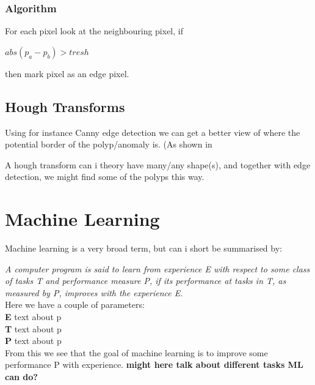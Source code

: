 \documentclass[a4paper,english]{ifimaster}
\begin{document}
	    \subsubsection{Algorithm}
	      For each pixel look at the neighbouring pixel, if \\
	      
	      \begin{centering} 
		$ abs(p_a - p_b)>tresh $\\ 
	      \end{centering}
	      
	      then mark pixel as an edge pixel. \\
	      
	  \subsection{Hough Transforms}
	    Using for instance Canny edge detection %
	    we can get a better view of where the potential border of the polyp/anomaly is. (As shown in %
	    
	    A hough transform can i theory have many/any shape(s), and together with edge detection, we might find some of the polyps this way.
	    
	    
	  
	  
	\section{Machine Learning}
	Machine learning is a very broad term, but can i short be summarised by:\\
	\vspace{10px}
	
	\textit{ A computer program is said to learn from experience E with respect to 
	some class of tasks T and performance measure P, if its performance at
	tasks in T, as measured by P, improves with the experience E. } 
	\cite{MitchellTomM1997Ml}\\
	
	\vspace{10px}
	Here we have a couple of parameters:\\
	\textbf{E} text about p\\
	\textbf{T} text about p\\
	\textbf{P} text about p\\
	
	From this we see that the goal of machine learning is to improve some performance P with experience.
	\textbf{might here talk about different tasks ML can do?}
	
\end{document}

